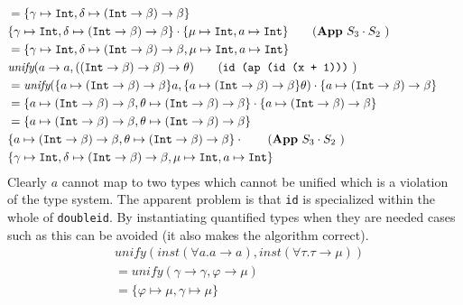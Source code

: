 \documentclass[11pt,oneside,a4paper]{report}
\begin{document}
\begin{exmp}
\begin{align}
    & = \{ \gamma \mapsto \texttt{Int}, \delta \mapsto (\texttt{Int} \rightarrow \beta) \rightarrow \beta \} \tag*{}\\
    &\{ \gamma \mapsto \texttt{Int}, \delta \mapsto (\texttt{Int} \rightarrow \beta) \rightarrow \beta \} \cdot \{ \mu \mapsto \texttt{Int}, a \mapsto \texttt{Int} \} \tag{\textbf{App} $S_3 \cdot S_2$ }\\
    & = \{ \gamma \mapsto \texttt{Int}, \delta \mapsto (\texttt{Int} \rightarrow \beta) \rightarrow \beta, \mu \mapsto \texttt{Int}, a \mapsto \texttt{Int} \} \tag*{}\\
    &\textit{unify}(a \rightarrow a, ((\texttt{Int} \rightarrow \beta) \rightarrow \beta) \rightarrow \theta) \tag{\texttt{id (ap (id (x + 1)))} }\\
    &= \textit{unify}(
     \{ a \mapsto  (\texttt{Int} \rightarrow \beta) \rightarrow \beta \} a,
     \{ a \mapsto  (\texttt{Int} \rightarrow \beta) \rightarrow \beta\} \theta
    ) \cdot \{ a \mapsto  (\texttt{Int} \rightarrow \beta) \rightarrow \beta\} \tag*{}\\
    &= \{ a \mapsto (\texttt{Int} \rightarrow \beta) \rightarrow \beta, \theta \mapsto (\texttt{Int} \rightarrow \beta) \rightarrow \beta \} \cdot \{ a \mapsto (\texttt{Int} \rightarrow \beta) \rightarrow \beta\} \tag*{}\\
    &= \{ a \mapsto (\texttt{Int} \rightarrow \beta) \rightarrow \beta, \theta \mapsto (\texttt{Int} \rightarrow \beta) \rightarrow \beta \} \tag*{}\\
    &\{ a \mapsto (\texttt{Int} \rightarrow \beta) \rightarrow \beta, \theta \mapsto (\texttt{Int} \rightarrow \beta) \rightarrow \beta \} \cdot \tag{\textbf{App} $S_3 \cdot S_2$ }\\
    &\{ \gamma \mapsto \texttt{Int}, \delta \mapsto (\texttt{Int} \rightarrow \beta) \rightarrow \beta, \mu \mapsto \texttt{Int}, a \mapsto \texttt{Int} \} \tag*{}
\end{align}
    Clearly $a$ cannot map to two types which cannot be unified which is a violation of the type system.
    The apparent problem is that \texttt{id} is specialized within the whole of \texttt{doubleid}.
    By instantiating quantified types when they are needed cases such as this can be avoided (it also makes the algorithm correct).
    \begin{align}
        &\textit{unify}(\textit{inst}(\forall a . a \rightarrow a), \textit{inst}(\forall \tau . \tau \rightarrow \mu))\\
        & = \textit{unify}(\gamma \rightarrow \gamma, \varphi \rightarrow \mu) \tag*{}\\
        & = \{ \varphi \mapsto \mu, \gamma \mapsto \mu \} \tag*{}
    \end{align}
\end{exmp}
\end{document}
